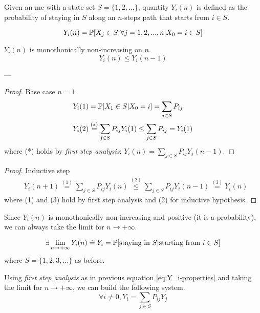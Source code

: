	\begin{definition}
		Given an \gls{mc} with a state set $S = \{1, 2, ...\}$, quantity $Y_i(n)$ is defined as the probability of staying in $S$ along an $n$-steps path that starts from $i \in S$.

		$$ Y_i(n) = \mathbb{P}[X_j \in S ~\forall j=1, 2, ..., n | X_0 = i \in S] $$
	\end{definition}

	\begin{theorem}
		$Y_i(n)$ is monothonically non-increasing on $n$.
		$$ Y_i(n) \le Y_i(n-1) $$
	\end{theorem}
	---
	\begin{proof} Base case $n=1$
		\begin{equation}\begin{split} \label{eq:Y_i-properties}
			& Y_i(1) = \mathbb{P}[X_1 \in S | X_0 = i] = \sum_{j \in S} P_{ij} \\
			& Y_i(2) \stackrel{(*)}{=} \sum_{j \in S} P_{ij} Y_i(1) \le \sum_{j \in S} P_{ij} = Y_i(1)
		\end{split}\end{equation}
		where (*) holds by \emph{first step analysis}: $ Y_i(n) = \sum_{j \in S} P_{ij} Y_j(n-1) $.
	\end{proof}

	\begin{proof} Inductive step
		\begin{equation}\begin{split}
			& Y_i(n+1) \stackrel{(1)}{=} \sum_{j \in S} P_{ij} Y_i(n) \stackrel{(2)}{\le} \sum_{j \in S} P_{ij} Y_i(n-1) \stackrel{(3)}{=} Y_i(n)
		\end{split}\end{equation}
		where (1) and (3) hold by first step analysis and (2) for inductive hypothesis.
	\end{proof}

	\begin{lemma}
		Since $Y_i(n)$ is monothonically non-increasing and positive (it is a probability), we can always take the limit for $n \to +\infty$.

		$$ \exists \lim_{n \to +\infty} Y_i(n) \stackrel{.}{=} Y_i = \mathbb{P}[\text{staying in } S | \text{starting from } i \in S] $$
		where $ S = \{ 1, 2, 3, ...\} $ as before.

		Using \emph{first step analysis} as in previous equation \ref{eq:Y_i-properties} and taking the limit for $n \to +\infty $, we can build the following system.
		\begin{equation} \label{eq:Yj_system}
			\forall i \neq 0, Y_i = \sum_{j \in S} P_{ij} Y_j
		\end{equation}
	\end{lemma}

